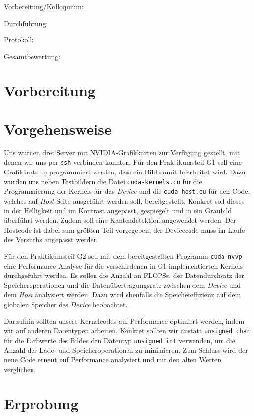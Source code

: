 \documentclass[12pt,a4paper]{scrartcl}
\begin{document}
Vorbereitung/Kolloquium:

Durchf\"uhrung:

Protokoll:

Gesamtbewertung:
\clearpage



\section{Vorbereitung}


\section{Vorgehensweise}
Uns wurden drei Server mit NVIDIA-Grafikkarten zur Verf\"ugung gestellt, mit denen wir uns per \texttt{ssh} verbinden konnten.
F\"ur den Praktikumsteil G1 soll eine Grafikkarte so programmiert werden, dass ein Bild damit bearbeitet wird.
Dazu wurden uns neben Testbildern die Datei \texttt{cuda-kernels.cu} f\"ur die Programmierung der Kernels für das \textit{Device} und die \texttt{cuda-host.cu} f\"ur den Code, welches auf \textit{Host}-Seite ausgef\"uhrt werden soll, bereitgestellt.
Konkret soll dieses in der Helligkeit und im Kontrast angepasst, gespiegelt und in ein Graubild \"uberf\"uhrt werden.
Zudem soll eine Kantendetektion angewendet werden.
Der Hostcode ist dabei zum gr\"o\ss ten Teil vorgegeben, der Devicecode muss im Laufe des Versuchs angepasst werden.

F\"ur den Praktikumsteil G2 soll mit dem bereitgestellten Programm \texttt{cuda-nvvp} eine Performance-Analyse f\"ur die verschiedenen in G1 implementierten Kernels durchgef\"uhrt werden.
Es sollen die Anzahl an FLOPSs, der Datendurchsatz der Speicheroperationen und die Daten\"ubertragungsrate zwischen dem \textit{Device} und dem \textit{Host} analysiert werden.
Dazu wird ebenfalls die Speichereffizienz auf dem globalen Speicher des \textit{Device} beobachtet.

Daraufhin sollten unsere Kernelcodes auf Performance optimiert werden, indem wir auf anderen Datentypen arbeiten.
Konkret sollten wir anstatt \texttt{unsigned char} f\"ur die Farbwerte des Bildes den Datentyp \texttt{unsigned int} verwenden, um die Anzahl der Lade- und Speicheroperationen zu minimieren.
Zum Schluss wird der neue Code erneut auf Performance analysiert und mit den alten Werten verglichen.
\section{Erprobung}
\end{document}
